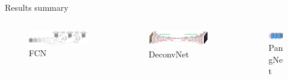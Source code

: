 \documentclass{beamer}
\begin{document}
\begin{frame}{Results summary}
\begin{columns}
\begin{column}{0.4\textwidth}
\begin{figure}
\includegraphics[width = \linewidth, left]{FCN.png}
\caption{FCN}
\end{figure}
\end{column}

\begin{column}{0.3\textwidth}
\begin{figure}
\includegraphics[width = \linewidth]{DeconvNet.png}
\caption{DeconvNet}
\end{figure}
\end{column}

\begin{column}{0.3\textwidth}
\begin{figure}
\includegraphics[width = \linewidth]{PangNet.png}
\caption{PangNet}
\end{figure}
\end{column}

\end{columns}

\end{frame}
\end{document}
